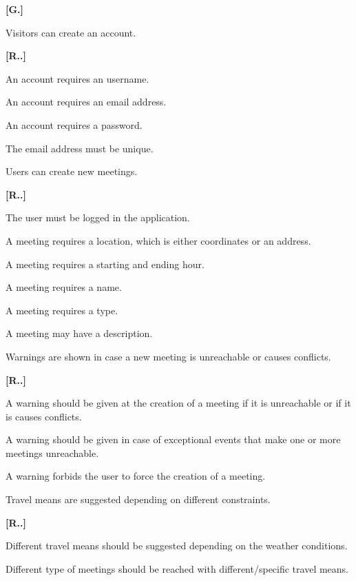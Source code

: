 \begin{list}
{\bfseries{}[G.]~}
{
}
\item Visitors can create an account.
\begin{list}
	{\bfseries{}[R..]~}
	{
	}
\item An account requires an username.
\item An account requires an email address.
\item An account requires a password.
\item The email address must be unique.
\end{list}
\item Users can create new meetings.
\begin{list}
	{\bfseries{}[R..]~}
	{
	}
	\item The user must be logged in the application.
\item A meeting requires a location, which is either coordinates or an address.
\item A meeting requires a starting and ending hour.
\item A meeting requires a name.
\item A meeting requires a type.
\item A meeting may have a description.
\end{list}
\item Warnings are shown in case a new meeting is unreachable or causes conflicts.
\begin{list}
	{\bfseries{}[R..]~}
	{
	}
\item A warning should be given at the creation of a meeting if it is unreachable or if it is causes conflicts.
\item A warning should be given in case of exceptional events that make one or more meetings unreachable.
\item A warning forbids the user to force the creation of a meeting.
\end{list}
\item Travel means are suggested depending on different constraints.
\begin{list}
	{\bfseries{}[R..]~}
	{
	}
\item Different travel means should be suggested depending on the weather conditions.
\item Different type of meetings should be reached with different/specific travel means.

\end{list}
\end{list}
